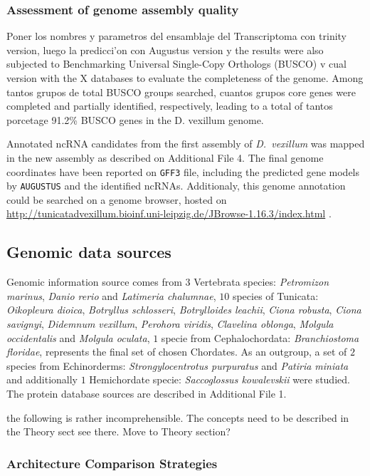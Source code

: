 \documentclass[11pt]{article}
\newcommand{\TODO}[1]{\begingroup\color{red}#1\endgroup}
\newcommand{\CAVH}[1]{\begingroup\color{green}#1\endgroup}
\begin{document}
\subsubsection*{Assessment of genome assembly quality} 
\TODO{Poner los nombres y parametros del ensamblaje del Transcriptoma con trinity
version, luego la predicci'on con Augustus version y the results  were also
subjected to Benchmarking Universal Single-Copy Orthologs (BUSCO) v cual version
with the \TODO{X databases} to evaluate the completeness of the genome. Among
tantos grupos de  total BUSCO groups searched, cuantos grupos core genes were
completed and partially identified, respectively, leading to a total of tantos
porcetage 91.2\% BUSCO genes in the D. vexillum genome.}

Annotated ncRNA candidates from the first assembly of \textit{D.\ vexillum} was
mapped in the new assembly as described on Additional File 4. The final genome
coordinates have been reported on \texttt{GFF3} file, including the predicted
gene models by \texttt{AUGUSTUS} and the identified ncRNAs. Additionaly, this
genome annotation could be searched on a genome browser, hosted on
\url{http://tunicatadvexillum.bioinf.uni-leipzig.de/JBrowse-1.16.3/index.html}
\cite{}.

\subsection*{Genomic data sources}

Genomic information source comes from $3$ Vertebrata species:
\textit{Petromizon marinus}, \textit{Danio rerio} and 
\textit{Latimeria chalumnae}, $10$ species of Tunicata: \textit{Oikopleura 
dioica}, \textit{Botryllus schlosseri}, \textit{Botrylloides 
leachii}, \textit{Ciona robusta}, \textit{Ciona savignyi}, \textit{Didemnum 
vexillum}, \textit{Perohora viridis}, \textit{Clavelina oblonga}, 
\textit{Molgula occidentalis} and \textit{Molgula oculata}, $1$ specie 
from Cephalochordata: \textit{Branchiostoma floridae}, represents the final set 
of chosen Chordates. As an outgroup, a set of $2$ species from Echinorderms: 
\textit{Strongylocentrotus purpuratus} and \textit{Patiria miniata} and 
additionally $1$ Hemichordate specie: \textit{Saccoglossus kowalevskii} were 
studied. The protein database sources are described in Additional File 1. 

\TODO{the following is rather incomprehensible. The concepts need to be described in the Theory sect 
see there.} \CAVH{Move to Theory section?}
\subsubsection*{Architecture Comparison Strategies}
\end{document}
